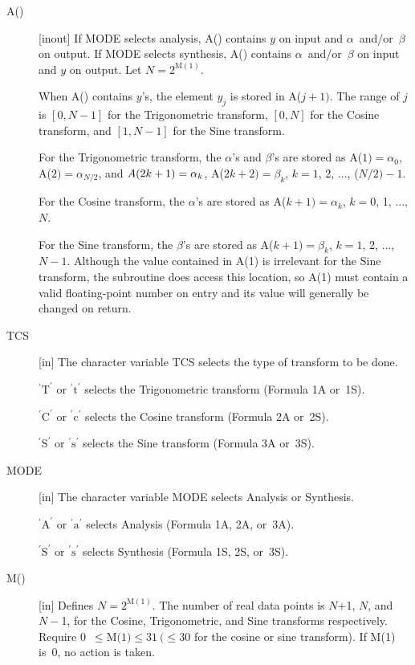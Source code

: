 \documentclass[twoside]{MATH77}
\begin{document}
\begin{description}
\item[A()]  [inout] If MODE selects analysis, A() contains $y$ on input and $%
\alpha $\ and/or\ $\beta $ on output. If MODE selects synthesis, A()
contains $\alpha $\ and/or\ $\beta $ on input and $y$ on output. Let $N
=2^{\text{M}(1)}.$

When A() contains $y$'s, the element $y_j$ is stored in A($j+1)$.
The range of $j$ is $[0, N-1]$ for the Trigonometric transform, $%
[0, N]$ for the Cosine transform, and $[1, N-1]$ for
the Sine transform.

For the Trigonometric transform, the $\alpha $'s and $\beta $'s
are stored as A($1)=\alpha _0$, A($2)=\alpha _{N/2}$, and ${%
\textstyle A}(2k+1)=\alpha _k$, A($2k+2)=\beta _k$, $k=1$, 2, ..., ($N/2)-1.$

For the Cosine transform, the $\alpha $'s are stored as A($k+1)=\alpha _k$,
$k=0$, 1, ..., $N$.

For the Sine transform, the $\beta $'s are stored as A($k+1)=\beta
_k$, $k=1$, 2, ..., $N-1$. Although the value contained in A(1) is
irrelevant for the Sine transform, the subroutine does access this location,
so A(1) must contain a valid floating-point number on entry and its value
will generally be changed on return.

\item[TCS]  [in] The character variable TCS selects the type of transform to
be done.

$^{\prime }\text{T}^{\prime }$ or $^{\prime }\text{t}^{\prime }$ selects the Trigonometric
transform (Formula 1A or~1S).

$^{\prime }\text{C}^{\prime }$ or $^{\prime }\text{c}^{\prime }$ selects the Cosine
transform (Formula 2A or~2S).

$^{\prime }\text{S}^{\prime }$ or $^{\prime }\text{s}^{\prime }$ selects the Sine
transform (Formula 3A or~3S).

\item[MODE]  [in] The character variable MODE selects Analysis or Synthesis.

$^{\prime }\text{A}^{\prime }$ or $^{\prime }\text{a}^{\prime }$ selects Analysis (Formula
1A, 2A, or~3A).

$^{\prime }\text{S}^{\prime }$ or $^{\prime }\text{s}^{\prime }$ selects Synthesis
(Formula 1S, 2S, or~3S).

\item[M()] [in] Defines $N=2^{\text{M}(1)}$.  The number of real data
points is $N$+1, $N$, and $N{-}$1, for the Cosine, Trigonometric, and Sine
transforms respectively.  Require 0~$\leq \text{M(1)} \leq 31\ (\leq 30$
for the cosine or sine transform).  If M(1) is~0, no action is taken.


\end{description}
\end{document}
